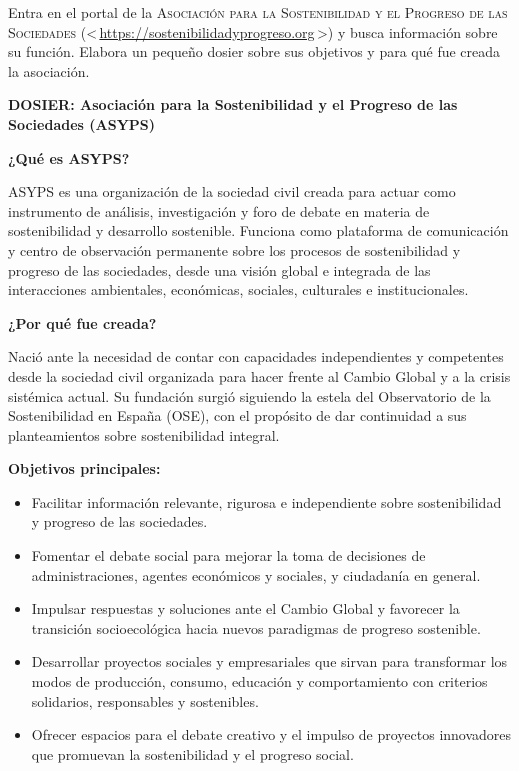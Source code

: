 {
	Entra en el portal de la \textsc{Asociación para la Sostenibilidad y el Progreso de las
		Sociedades} (\textless\,\url{https://sostenibilidadyprogreso.org}\,\textgreater) y busca
	información sobre su función. Elabora un pequeño dosier sobre sus objetivos y para qué
	fue creada la asociación.
}

\begin{solution}

	\textbf{DOSIER: Asociación para la Sostenibilidad y el Progreso de las Sociedades (ASYPS)}

	\medskip

	\textbf{¿Qué es ASYPS?}

	ASYPS es una organización de la sociedad civil creada para actuar como instrumento de análisis,
	investigación y foro de debate en materia de sostenibilidad y desarrollo sostenible. Funciona como
	plataforma de comunicación y centro de observación permanente sobre los procesos de sostenibilidad
	y progreso de las sociedades, desde una visión global e integrada de las interacciones ambientales,
	económicas, sociales, culturales e institucionales.

	\medskip

	\textbf{¿Por qué fue creada?}

	Nació ante la necesidad de contar con capacidades independientes y competentes desde la sociedad
	civil organizada para hacer frente al Cambio Global y a la crisis sistémica actual. Su fundación
	surgió siguiendo la estela del Observatorio de la Sostenibilidad en España (OSE), con el propósito
	de dar continuidad a sus planteamientos sobre sostenibilidad integral.

	\medskip

	\textbf{Objetivos principales:}

	\begin{itemize}
		\item Facilitar información relevante, rigurosa e independiente sobre sostenibilidad y progreso
		      de las sociedades.
		\item Fomentar el debate social para mejorar la toma de decisiones de administraciones, agentes
		      económicos y sociales, y ciudadanía en general.
		\item Impulsar respuestas y soluciones ante el Cambio Global y favorecer la transición
		      socioecológica hacia nuevos paradigmas de progreso sostenible.
		\item Desarrollar proyectos sociales y empresariales que sirvan para transformar los modos de
		      producción, consumo, educación y comportamiento con criterios solidarios, responsables y
		      sostenibles.
		\item Ofrecer espacios para el debate creativo y el impulso de proyectos innovadores que
		      promuevan la sostenibilidad y el progreso social.
	\end{itemize}


\end{solution}
